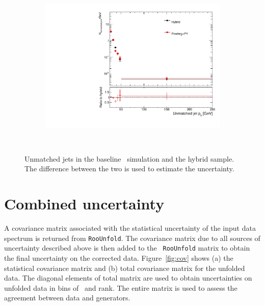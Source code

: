 \begin{figure}
\begin{subfigure}[]{0.45\textwidth}
\end{subfigure}
~
\begin{subfigure}[]{0.45\textwidth}
\includegraphics[width=\textwidth]{fig/Pileup/RecoPtFalseJet3.pdf}
\end{subfigure}
~
\caption{Unmatched jets in the baseline \ttbar\ simulation and the hybrid sample. The difference between the two is used to estimate the uncertainty.}
\label{fig:FalseComp}
\end{figure}

\section{Combined uncertainty}
A covariance matrix associated with the statistical uncertainty of the input data spectrum is returned from \texttt{RooUnfold}. The covariance matrix due to all sources of uncertainty described above is then added to the \texttt{ RooUnfold} matrix to obtain the final uncertainty on the corrected data. Figure~\ref{fig:cov}  shows (a) the statistical covariance matrix  and (b) total covariance matrix for the unfolded data. The diagonal elements of total matrix are used to obtain uncertainties on unfolded data in bins of \pt\ and rank. The entire matrix is used to assess the agreement between data and generators. 

